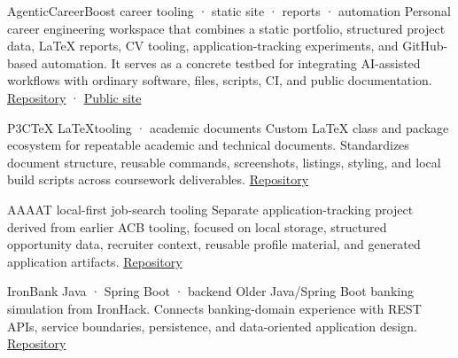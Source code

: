 \documentclass[a4paper,10pt]{article}
\begin{document}
  \hfill
  \begin{minipage}[t][\BodyHeight]{\MainWidth}
    \small



    \project
      {AgenticCareerBoost}
      {career tooling · static site · reports · automation}
      {Personal career engineering workspace that combines a static portfolio,
       structured project data, LaTeX reports, CV tooling, application-tracking
       experiments, and GitHub-based automation. It serves as a concrete testbed
       for integrating AI-assisted workflows with ordinary software, files,
       scripts, CI, and public documentation.}
      {\href{https://github.com/DidacLL/AgenticCareerBoost}{Repository} ·
       \href{https://didacll.github.io/}{Public site}}

    \project
      {P3CTeX}
      {\LaTeX tooling · academic documents}
      {Custom LaTeX class and package ecosystem for repeatable academic and
       technical documents. Standardizes document structure, reusable commands,
       screenshots, listings, styling, and local build scripts across coursework
       deliverables.}
      {\href{https://github.com/DidacLL/P3CTeX}{Repository}}

    \project
      {AAAAT}
      {local-first job-search tooling}
      {Separate application-tracking project derived from earlier ACB tooling,
       focused on local storage, structured opportunity data, recruiter context,
       reusable profile material, and generated application artifacts.}
      {\href{https://github.com/DidacLL/AAAAT}{Repository}}

    \project
      {IronBank}
      {Java · Spring Boot · backend}
      {Older Java/Spring Boot banking simulation from IronHack. Connects
       banking-domain experience with REST APIs, service boundaries,
       persistence, and data-oriented application design.}
      {\href{https://github.com/DidacLL/Ironhack-IronBank_FinalProject_vBNKsys}{Repository}}


\end{minipage}
\end{document}
